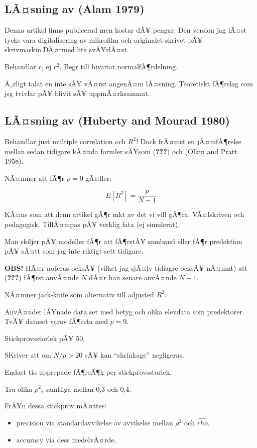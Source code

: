 \documentclass[]{article}
\providecommand{\tightlist}{%
  \setlength{\itemsep}{0pt}\setlength{\parskip}{0pt}}
\begin{document}
\subsection{LÃ¤sning av (Alam 1979)}\label{lasning-av-alam1979}

Denna artikel finns publicerad men kostar dÃ¥ pengar. Den version jag
lÃ¤st tycks vara digitalisering av mikrofilm och originalet skrivet pÃ¥
skrivmaskin.DÃ¤rmed lite svÃ¥rlÃ¤st.

Behandlar \(r\), ej \(r^2\). Begr till bivariat normalfÃ¶rdelning.

Ã„rligt talat en inte sÃ¥ vÃ¤rst angenÃ¤m lÃ¤sning. Teoretiskt fÃ¶rslag
som jsg tvivlar pÃ¥ blivit sÃ¥ uppmÃ¤rksammat.

\subsection{LÃ¤sning av (Huberty and Mourad
1980)}\label{lasning-av-huberty1980}

Behandlar just multiple correlation och \(R^2\)! Dock frÃ¤mst en
jÃ¤mfÃ¶relse mellan sedan tidigare kÃ¤nda formler sÃ¥som
({\textbf{???}}) och (Olkin and Pratt 1958).

NÃ¤mner att fÃ¶r \(\rho = 0\) gÃ¤ller:

\[E[R^2] = \frac{p}{N-1}\]

KÃ¤ns som att denn artikel gÃ¶r mkt av det vi vill gÃ¶ra. VÃ¤lskriven
och pedagogisk. TillÃ¤mpas pÃ¥ verklig fata (ej simulerat).

Man skiljer pÃ¥ modeller fÃ¶r att fÃ¶rstÃ¥ samband eller fÃ¶r predektion
pÃ¥ sÃ¤tt som jag inte riktigt sett tidigare.

\textbf{OBS!} HÃ¤r noteras ocksÃ¥ (vilket jag sjÃ¤lv tidiagre ocksÃ¥
nÃ¤mnt) att ({\textbf{???}}) fÃ¶rst anvÃ¤nde \(N\) dÃ¤r han senare
anvÃ¤nde \(N - 1\).

NÃ¤mner jack-knife som alternativ till adjusted \(R^2\).

AnvÃ¤nder lÃ¥nade data set med betyg och olika elevdata som predektorer.
TvÃ¥ dataset varav fÃ¶rsta med \(p = 9\).

Stickprovsstorlek pÃ¥ 50.

SKriver att om \(N/p>20\) sÃ¥ kan ``shrinkage'' negligeras.

Endast tio upprepade fÃ¶rsÃ¶k per stickprovsstorlek.

Tra olika \(\rho^2\), samtliga mellan 0,3 och 0,4.

FrÃ¥n dessa stickprov mÃ¤ttes:

\begin{itemize}
\tightlist
\item
  precision via standardavvikelse av avvikelse mellan \(\rho^2\) och
  \(\hat{rho}\).
\item
  accuracy via dess medelvÃ¤rde.
\end{itemize}
\end{document}

